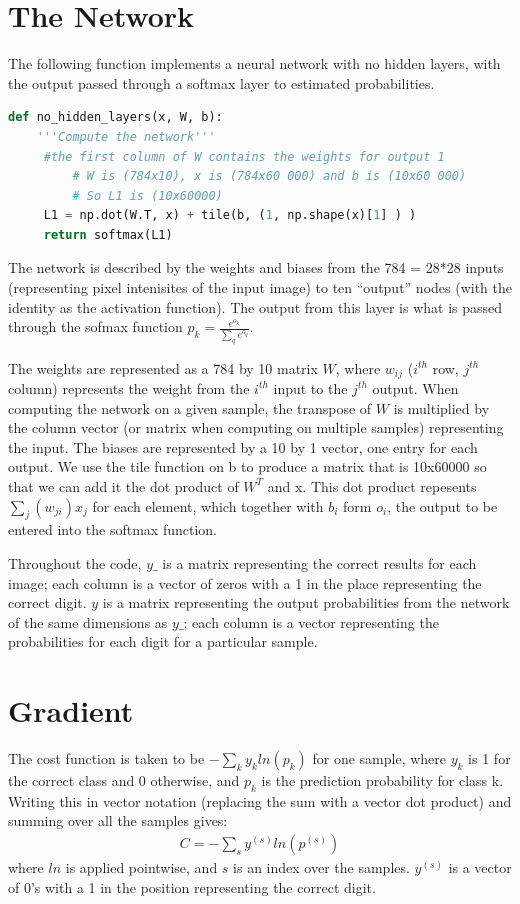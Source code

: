 \documentclass{article}
\begin{document}
   \section{The Network}
   The following function implements a neural network with no hidden layers, with the
   output passed through a softmax layer to estimated probabilities.

   \begin{lstlisting}[language=Python]
      def no_hidden_layers(x, W, b):
	'''Compute the network'''
   	 #the first column of W contains the weights for output 1
    	 # W is (784x10), x is (784x60 000) and b is (10x60 000)
    	 # So L1 is (10x60000)
   	 L1 = np.dot(W.T, x) + tile(b, (1, np.shape(x)[1] ) )
  	 return softmax(L1)
   \end{lstlisting}

   The network is described by the weights and biases from the 784 = 28*28 inputs
   (representing pixel intenisites of the input image) to ten ``output'' nodes
   (with the identity as the activation function). The output from this layer is what is
   passed through the sofmax function $p_k = \frac{ e^{o_k} }{ \sum_q e^{o_q}}$.

   The weights are represented as a 784 by 10 matrix $W$, where $w_{ij}$ ($i^{th}$ row, $j^{th}$
   column) represents the weight from the $i^{th}$ input to the $j^{th}$ output.
   When computing the network on a given sample, the transpose of $W$ is multiplied
   by the column vector (or matrix when computing on multiple samples) representing the input.
   The biases are represented by a 10 by 1 vector, one entry for each output. We use the tile function on
   b to produce a matrix that is 10x60000 so that we can add it the dot product of $W^T $ and x. This dot product
  repesents $\sum_j ( w_{ji} ) x_j$ for each element, which together with $b_i$ form $o_i$, the output to be entered into the
 softmax function.

   Throughout the code, $y\_$ is a matrix representing the correct results for each image; each column is a
   vector of zeros with a 1 in the place representing the correct digit.
   $y$ is a matrix representing the output probabilities from the network of the same dimensions
   as $y\_$; each column is a vector representing the probabilities for each digit for a
   particular sample.

   \section{Gradient}
   The cost function is taken to be $- \sum_{k} y_k ln(p_k)$ for one sample, where $y_k$ is
   1 for the correct class and 0 otherwise, and $p_k$ is the prediction probability for class k.
   Writing this in vector notation (replacing the sum with a vector dot product) and
   summing over all the samples gives:
      \begin{equation*} \begin{split}
         C = - \sum_{s} y^{(s)} ln(p^{(s)})
      \end{split} \end{equation*}
   where $ln$ is applied pointwise, and $s$ is an index over the samples. $y^{(s)}$ is
   a vector of 0's with a 1 in the position representing the correct digit.
\end{document}
